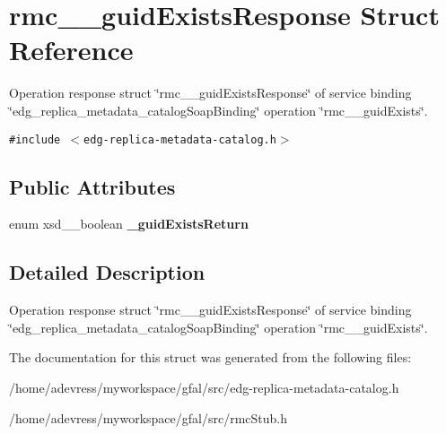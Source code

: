 \section{rmc\_\-\_\-guid\-Exists\-Response Struct Reference}
\label{structrmc____guidExistsResponse}
Operation response struct \char`\"{}rmc\_\-\_\-guid\-Exists\-Response\char`\"{} of service binding \char`\"{}edg\_\-replica\_\-metadata\_\-catalog\-Soap\-Binding\char`\"{} operation \char`\"{}rmc\_\-\_\-guid\-Exists\char`\"{}.  


{\tt \#include $<$edg-replica-metadata-catalog.h$>$}

\subsection*{Public Attributes}
\begin{CompactItemize}
\item 
enum xsd\_\-\_\-boolean \textbf{\_\-guid\-Exists\-Return}\label{structrmc____guidExistsResponse_b9076c20c6e3ed1ba63ba2d278d1c0dc}

\end{CompactItemize}


\subsection{Detailed Description}
Operation response struct \char`\"{}rmc\_\-\_\-guid\-Exists\-Response\char`\"{} of service binding \char`\"{}edg\_\-replica\_\-metadata\_\-catalog\-Soap\-Binding\char`\"{} operation \char`\"{}rmc\_\-\_\-guid\-Exists\char`\"{}. 



The documentation for this struct was generated from the following files:\begin{CompactItemize}
\item 
/home/adevress/myworkspace/gfal/src/edg-replica-metadata-catalog.h\item 
/home/adevress/myworkspace/gfal/src/rmc\-Stub.h\end{CompactItemize}
